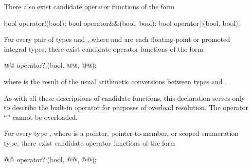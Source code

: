 \pnum
There also exist candidate operator functions of the form
\begin{codeblock}
bool    operator!(bool);
bool    operator&&(bool, bool);
bool    operator||(bool, bool);
\end{codeblock}

\pnum
For every pair of types  and ,
where  and  are each
floating-point or promoted integral types,
there exist candidate operator functions of the form
\begin{codeblock}
@@      operator?:(bool, @@, @@);
\end{codeblock}
where
is the result of the usual arithmetic conversions between types
and
.
\begin{note}
As with all these descriptions of candidate functions, this declaration serves
only to describe the built-in operator for purposes of overload resolution.
The operator
``''
cannot be overloaded.
\end{note}

\pnum
For every type
,
where
is a pointer, pointer-to-member, or scoped enumeration type, there exist candidate operator
functions of the form
\begin{codeblock}
@@       operator?:(bool, @@, @@);
\end{codeblock}%
